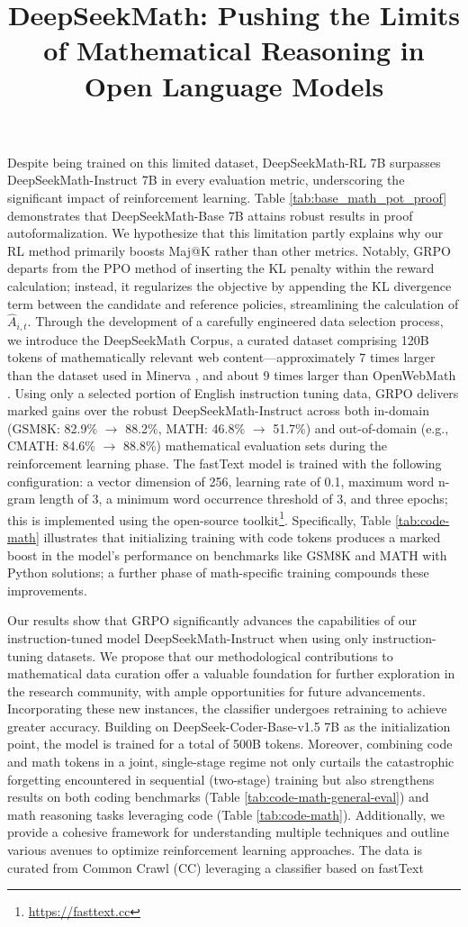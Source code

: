 \title{DeepSeekMath: Pushing the Limits of Mathematical Reasoning in Open Language Models}
Despite being trained on this limited dataset, DeepSeekMath-RL 7B surpasses DeepSeekMath-Instruct 7B in every evaluation metric, underscoring the significant impact of reinforcement learning. Table \ref{tab:base_math_pot_proof} demonstrates that DeepSeekMath-Base 7B attains robust results in proof autoformalization. We hypothesize that this limitation partly explains why our RL method primarily boosts Maj@K rather than other metrics. Notably, GRPO departs from the PPO method of inserting the KL penalty within the reward calculation; instead, it regularizes the objective by appending the KL divergence term between the candidate and reference policies, streamlining the calculation of $\hat{A}_{i,t}$. Through the development of a carefully engineered data selection process, we introduce the DeepSeekMath Corpus, a curated dataset comprising 120B tokens of mathematically relevant web content—approximately 7 times larger than the dataset used in Minerva \citep{minerva}, and about 9 times larger than OpenWebMath \citep{openwebmath}. Using only a selected portion of English instruction tuning data, GRPO delivers marked gains over the robust DeepSeekMath-Instruct across both in-domain (GSM8K: 82.9\% $\rightarrow$ 88.2\%, MATH: 46.8\% $\rightarrow$ 51.7\%) and out-of-domain (e.g., CMATH: 84.6\% $\rightarrow$ 88.8\%) mathematical evaluation sets during the reinforcement learning phase. The fastText model is trained with the following configuration: a vector dimension of 256, learning rate of 0.1, maximum word n-gram length of 3, a minimum word occurrence threshold of 3, and three epochs; this is implemented using the open-source toolkit\footnote{\url{https://fasttext.cc}}. Specifically, Table \ref{tab:code-math} illustrates that initializing training with code tokens produces a marked boost in the model’s performance on benchmarks like GSM8K and MATH with Python solutions; a further phase of math-specific training compounds these improvements. \item Our results show that GRPO significantly advances the capabilities of our instruction-tuned model DeepSeekMath-Instruct when using only instruction-tuning datasets. We propose that our methodological contributions to mathematical data curation offer a valuable foundation for further exploration in the research community, with ample opportunities for future advancements. Incorporating these new instances, the classifier undergoes retraining to achieve greater accuracy. Building on DeepSeek-Coder-Base-v1.5 7B \citep{deepseek-coder} as the initialization point, the model is trained for a total of 500B tokens. Moreover, combining code and math tokens in a joint, single-stage regime not only curtails the catastrophic forgetting encountered in sequential (two-stage) training but also strengthens results on both coding benchmarks (Table \ref{tab:code-math-general-eval}) and math reasoning tasks leveraging code (Table \ref{tab:code-math}). Additionally, we provide a cohesive framework for understanding multiple techniques and outline various avenues to optimize reinforcement learning approaches. The data is curated from Common Crawl (CC) leveraging a classifier based on fastText 